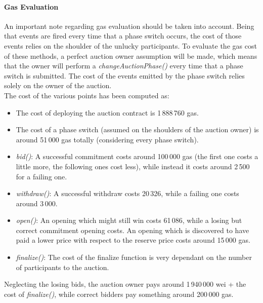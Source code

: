 \documentclass[11pt, a4paper]{report}
\begin{document}
	\paragraph*{Gas Evaluation}
	An important note regarding gas evaluation should be taken into account. Being that events are fired every time that a phase switch occurs, the cost of those events relies on the shoulder of the unlucky participants. To evaluate the gas cost of these methods, a perfect auction owner assumption will be made, which means that the owner will perform a \emph{changeAuctionPhase()} every time that a phase switch is submitted. The cost of the events emitted by the phase switch relies solely on the owner of the auction. \\
	The cost of the various points has been computed as: 
	\begin{itemize}
		\item The cost of deploying the auction contract is 1\,888\,760 gas. 
		\item The cost of a phase switch (assumed on the shoulders of the auction owner) is around 51\,000 gas totally (considering every phase switch).
		\item \emph{bid()}: A successful commitment costs around 100\,000 gas (the first one costs a little more, the following ones cost less), while instead it costs around 2\,500 for a failing one.
		\item \emph{withdraw()}: A successful withdraw costs 20\,326, while a failing one costs around 3\,000.
		\item \emph{open()}: An opening which might still win costs 61\,086, while a losing but correct commitment opening costs. An opening which is discovered to have paid a lower price with respect to the reserve price costs around 15\,000 gas.
		\item \emph{finalize()}: The cost of the finalize function is very dependant on the number of participants to the auction. 
	\end{itemize}

	Neglecting the losing bids, the auction owner pays around 1\,940\,000 wei + the cost of \emph{finalize()}, while correct bidders pay something around 200\,000 gas.
	
	
\end{document}
